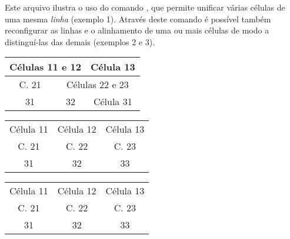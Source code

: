 \documentclass[a4paper,12pt]{article}
\begin{document}
	Este arquivo ilustra o uso do comando , que permite unificar várias células de uma mesma \emph{linha} (exemplo 1). Através deste comando é possível também reconfigurar as linhas e o alinhamento de uma ou mais células de modo a distinguí-las das demais (exemplos 2 e 3).
	
	
	\linhabase\hfill
	\begin{tabular}[c]{|c|c|c|}
		\hline
		\multicolumn{2}{|c|}{Células 11 e 12} & Célula 13       \\
		\hline
		C. 21     & \multicolumn{2}{|c|}{Células 22 e 23}       \\
		\hline
		31        & 32  & \multicolumn{1}{|c|}{Célula 31}       \\
		\hline
	\end{tabular}%
	\hfill\null
	
	
	\linhabase\hfill
	\begin{tabular}[c]{ccc}		
		Célula 11 & Célula 12                   & Célula 13 \\
		\cline{2-2}
		C. 21     & \multicolumn{1}{|c|}{C. 22} & C. 23     \\
		\cline{2-2}
		31        & 32                          & 33        \\
	\end{tabular}%
	\hfill\null
	
	
	\linhabase\hfill
	\begin{tabular}[c]{|c|c|c|}
		\hline
		Célula 11                  & Célula 12                 & Célula 13 \\
		\cline{1-1}\cline{3-3}
		\multicolumn{1}{|c}{C. 21} & \multicolumn{1}{c}{C. 22} & C. 23     \\
		\cline{1-1}\cline{3-3}
		31                         & 32                        & 33        \\
		\hline
	\end{tabular}%
	\hfill\null
		
\end{document}

